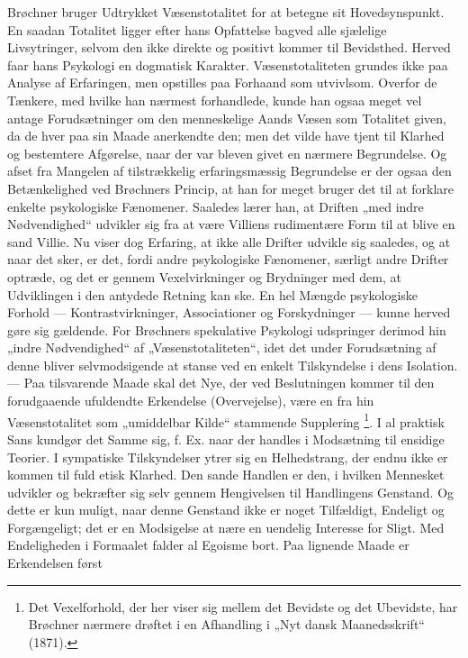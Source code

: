 \documentclass[12pt,a4paper,openany]{book}
\newcommand{\opage}[1]{\marginnote{\footnotesize\textit{[#1]}}}
\begin{document}
Brøchner bruger Udtrykket Væsenstotalitet for at betegne sit Hovedsynspunkt. En
saadan Totalitet ligger efter hans Opfattelse bagved alle sjælelige
Livsytringer, selvom den ikke direkte og positivt kommer til Bevidsthed. Herved
faar hans Psykologi en dogmatisk Karakter. Væsenstotaliteten grundes ikke paa
Analyse af Erfaringen, men opstilles paa Forhaand som utvivlsom. Overfor de
Tænkere, med hvilke han nærmest forhandlede, kunde han ogsaa meget vel antage
Forudsætninger om den menneskelige Aands Væsen som Totalitet given, da de hver
paa sin Maade anerkendte den; men det vilde have tjent til Klarhed og
bestemtere Afgørelse, naar der var bleven givet en nærmere Begrundelse. Og
afset fra Mangelen af tilstrækkelig erfaringsmæssig Begrundelse er der ogsaa
den Betænkelighed ved Brøchners Princip, at han for meget bruger det til at
forklare enkelte psykologiske Fænomener. Saaledes lærer han, at Driften „med
indre Nødvendighed“ udvikler sig fra at være Villiens rudimentære Form til at
blive en sand Villie. Nu viser dog Erfaring, at ikke alle Drifter udvikle sig
saaledes, og at naar det sker, er det, fordi andre psykologiske Fænomener,
særligt andre Drifter optræde, og det er gennem Vexelvirkninger og Brydninger
med dem, at Udviklingen i den antydede Retning kan ske. En hel Mængde
psykologiske Forhold --- Kontrastvirkninger, Associationer og Forskydninger ---
kunne herved gøre sig gældende. For Brøchners spekulative Psykologi udspringer
derimod hin „indre Nødvendighed“ af „Væsenstotaliteten“, idet det under
Forudsætning af denne bliver selvmodsigende at stanse ved en enkelt Tilskyndelse i
\setcounter{footnote}{0}%
\opage{201}dens Isolation. --- Paa tilsvarende Maade skal det Nye, der ved
Beslutningen kommer til den forudgaaende ufuldendte Erkendelse (Overvejelse),
være en fra hin Væsenstotalitet som „umiddelbar Kilde“ stammende Supplering%
\footnote[1]{Det Vexelforhold, der her viser sig mellem det Bevidste og det
Ubevidste, har Brøchner nærmere drøftet i en Afhandling i „Nyt dansk
Maanedsskrift“ (1871).}. I al praktisk Sans kundgør det Samme sig, f. Ex. naar
der handles i Modsætning til ensidige Teorier. I sympatiske Tilskyndelser ytrer
sig en Helhedstrang, der endnu ikke er kommen til fuld etisk Klarhed. Den sande
Handlen er den, i hvilken Mennesket udvikler og bekræfter sig selv gennem
Hengivelsen til Handlingens Genstand. Og dette er kun muligt, naar denne
Genstand ikke er noget Tilfældigt, Endeligt og Forgængeligt; det er en
Modsigelse at nære en uendelig Interesse for Sligt. Med Endeligheden i
Formaalet falder al Egoisme bort. Paa lignende Maade er Erkendelsen først
\end{document}
